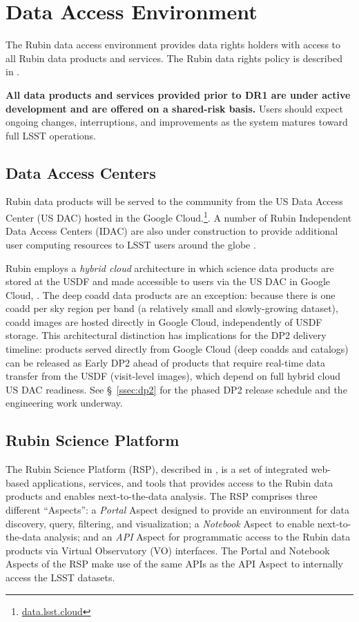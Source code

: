 \section{Data Access Environment}
\label{sec:access}

The Rubin data access environment provides data rights holders with access to all Rubin data products and services.
The Rubin data rights policy is described in .

\textbf{All data products and services provided prior to DR1 are under active development and are offered on a shared-risk basis.}
Users should expect ongoing changes, interruptions, and improvements as the system matures toward full LSST operations.

\subsection{Data Access Centers}
\label{ssec:dacs}
Rubin data products will be served to the community from the US Data Access Center (US DAC) hosted in the Google Cloud.\footnote{\url{data.lsst.cloud}}.
A number of Rubin Independent Data Access Centers (IDAC) are also under construction to provide additional user computing resources to LSST users around the globe .

Rubin employs a \emph{hybrid cloud} architecture in which science data products are stored at the USDF and made accessible to users via the US DAC in Google  Cloud, \cite[][]{2024SPIE13101E..2BO}.
The deep coadd data products are an exception: because there is one coadd per sky region per band (a relatively small and slowly-growing dataset), coadd images are hosted directly in Google Cloud, independently of USDF storage.
This architectural distinction has implications for the DP2 delivery timeline: products served directly from Google Cloud (deep coadds and catalogs) can be released as Early DP2 ahead of products that require real-time data transfer from the USDF (visit-level images), which depend on full hybrid cloud US DAC readiness.
See \S~\ref{ssec:dp2} for the phased DP2 release schedule and the engineering  work underway.

\subsection{Rubin Science Platform}
\label{ssec:rsp}
The Rubin Science Platform (RSP), described in , is a set of integrated web-based applications, services, and tools that provides access to the Rubin data products and enables next-to-the-data analysis.
The RSP comprises three different ``Aspects'': a \emph{Portal} Aspect designed to provide an environment for data discovery, query, filtering, and visualization; a \emph{Notebook} Aspect to enable next-to-the-data analysis; and an \emph{API} Aspect for programmatic access to the Rubin data products via Virtual Observatory (VO) interfaces.
The Portal and Notebook Aspects of the RSP make use of the same APIs as the API Aspect to internally access the LSST datasets.

